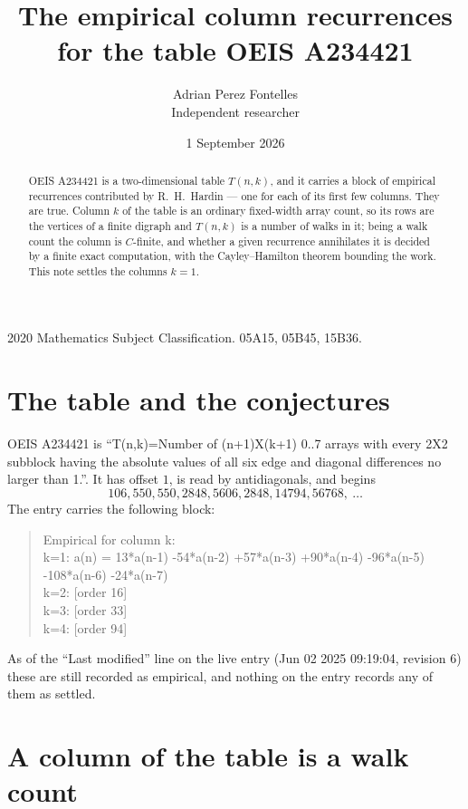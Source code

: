 \documentclass[11pt,a4paper]{article}
\title{The empirical column recurrences for the table OEIS A234421}
\author{Adrian Perez Fontelles\\ \small Independent researcher}
\date{1 September 2026}
\theoremstyle{plain}
\theoremstyle{definition}
\begin{document}
\maketitle

\begin{abstract}
OEIS A234421 is a two-dimensional table $T(n,k)$, and it carries a block of empirical
recurrences contributed by R.~H.~Hardin --- one for each of its first few columns. They are
true. Column $k$ of the table is an ordinary fixed-width array count, so its rows are the
vertices of a finite digraph and $T(n,k)$ is a number of walks in it; being a walk count the
column is $C$-finite, and whether a given recurrence annihilates it is decided by a finite
exact computation, with the Cayley--Hamilton theorem bounding the work. This note settles the columns $k=1$.
\end{abstract}

\noindent\small 2020 Mathematics Subject Classification. 05A15, 05B45, 15B36.\normalsize

\section{The table and the conjectures}

OEIS A234421 is ``T(n,k)=Number of (n+1)X(k+1) 0..7 arrays with every 2X2 subblock having the absolute values of all six edge and diagonal differences no larger than 1.''. It has offset $1$, is
read by antidiagonals, and begins
\[
106, 550, 550, 2848, 5606, 2848, 14794, 56768,\ \dots
\]
The entry carries the following block:
\begin{quote}\small
Empirical for column k:\\
k=1: a(n) = 13*a(n-1) -54*a(n-2) +57*a(n-3) +90*a(n-4) -96*a(n-5) -108*a(n-6) -24*a(n-7)\\
k=2: [order 16]\\
k=3: [order 33]\\
k=4: [order 94]\\
\end{quote}
As of the ``Last modified'' line on the live entry (Jun 02 2025 09:19:04, revision 6) these are still
recorded as empirical, and nothing on the entry records any of them as settled.

\section{A column of the table is a walk count}
\end{document}
